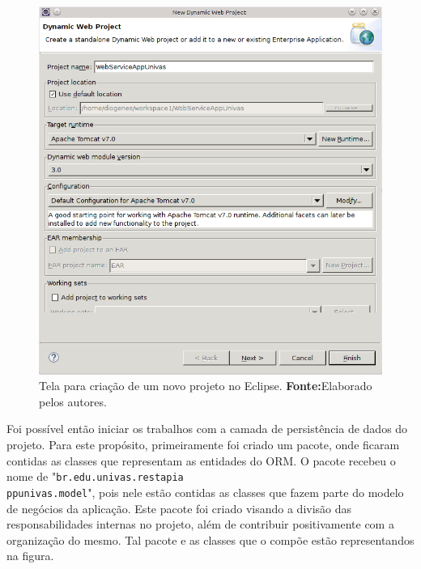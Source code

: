 	\begin{figure}[h!]
		\centerline{\includegraphics[scale=0.8]{./imagens/2_q_metodologico/4_procedimentos_resultados/43_webservice/432_desenvolvimento/desws4.png}}
		\caption[Tela para criação de um novo projeto no Eclipse]{Tela para criação de um novo projeto no Eclipse.
			\textbf{Fonte:}Elaborado pelos autores.}
		\label{fig:desws4}
	\end{figure}
	
	\pagebreak


	

	\par Foi possível então iniciar os trabalhos com a camada de persistência de
	dados do projeto. Para este propósito, primeiramente foi criado um pacote, onde
ficaram contidas as classes que representam as entidades do ORM. O pacote
recebeu o nome de "\texttt{br.edu.univas.restapia\\ppunivas.model}", pois nele
estão contidas as classes que fazem parte do modelo de negócios da aplicação.
Este pacote foi criado visando a divisão das responsabilidades internas no
projeto, além de contribuir positivamente com a organização do mesmo. Tal
pacote e as classes que o compõe estão representandos na figura.


